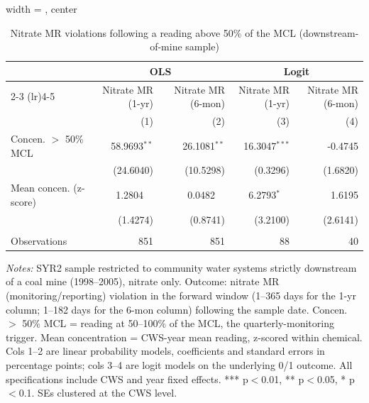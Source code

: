 
\begin{table}[htbp]
\caption{Nitrate MR violations following a reading above 50\% of the MCL (downstream-of-mine sample)}\label{tab:mr_concentration_lag_logit}
\centering
\begin{adjustbox}{width = \textwidth, center}
   \begin{tabular}{lrrrr}
      \toprule    
       & \multicolumn{2}{c}{OLS} & \multicolumn{2}{c}{Logit} \\ \cmidrule(lr){2-3} \cmidrule(lr){4-5}
                      & Nitrate MR (1-yr) & Nitrate MR (6-mon)  & Nitrate MR (1-yr) & Nitrate MR (6-mon) \\   
                      & (1)               & (2)                 & (3)               & (4)\\  
      \midrule 
      Concen. $>$ 50\% MCL       & 58.9693$^{**}$    & 26.1081$^{**}$      & 16.3047$^{***}$   & -0.4745\\   
                      & (24.6040)         & (10.5298)           & (0.3296)          & (1.6820)\\   
      Mean concen. (z-score)   & 1.2804$^{\phantom{**}}$            & 0.0482$^{\phantom{**}}$              & 6.2793$^{*\phantom{**}}$      & 1.6195\\   
                      & (1.4274)          & (0.8741)            & (3.2100)          & (2.6141)\\   
       \\
      Observations    & 851               & 851                 & 88                & 40\\  
      \bottomrule
   \end{tabular}
\end{adjustbox}
{\tiny\linespread{1}\selectfont \par \raggedright \textit{Notes:} SYR2 sample restricted to community water systems strictly downstream of a coal mine (1998--2005), nitrate only. Outcome: nitrate MR (monitoring/reporting) violation in the forward window (1--365 days for the 1-yr column; 1--182 days for the 6-mon column) following the sample date. Concen. $>$ 50\% MCL = reading at 50--100\% of the MCL, the quarterly-monitoring trigger. Mean concentration = CWS-year mean reading, z-scored within chemical. Cols 1--2 are linear probability models, coefficients and standard errors in percentage points; cols 3--4 are logit models on the underlying 0/1 outcome. All specifications include CWS and year fixed effects. *** p$<$0.01, ** p$<$0.05, * p$<$0.1. SEs clustered at the CWS level.}
\end{table}
